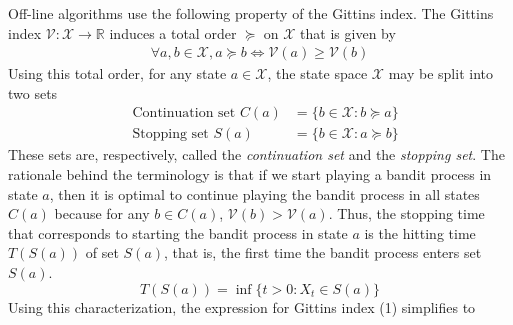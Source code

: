 \documentclass[11pt]{elegantbook}
\begin{document}
Off-line algorithms use the following property of the Gittins index. The Gittins
index $\mathcal{V}: \mathcal{X} \rightarrow \mathbb{R}$ induces a total order $\succeq$ on $\mathcal{X}$ that is given by
\begin{equation}
    \begin{aligned}
        \forall a,b\in \mathcal{X}, a\succeq b \Leftrightarrow \mathcal{V}(a)\geq \mathcal{V}(b)
    \end{aligned}
    \nonumber
\end{equation}
Using this total order, for any state $a\in \mathcal{X}$, the state space $\mathcal{X}$ may be split into two sets
\begin{equation}
    \begin{aligned}
        &\text{Continuation set }C(a)&=\{b\in \mathcal{X}:b\succeq a\}\\
        &\text{Stopping set }S(a)&=\{b\in \mathcal{X}:a\succeq b\}
    \end{aligned}
    \nonumber
\end{equation}
These sets are, respectively, called the \textit{continuation set} and the \textit{stopping set}. The rationale behind the terminology is that if
we start playing a bandit process in state $a$, then it is optimal to continue playing the bandit process in all states $C(a)$ because for any $b \in C(a)$, $\mathcal{V}(b) > \mathcal{V}(a)$. Thus, the stopping time that corresponds to starting the bandit process in state $a$ is the hitting time $T(S(a))$ of set $S(a)$, that is, the first time the bandit process enters set $S(a)$. $$T(S(a))=\inf\{t>0:X_t\in S(a)\}$$
Using this characterization, the expression for Gittins index (1) simplifies to
\end{document}
